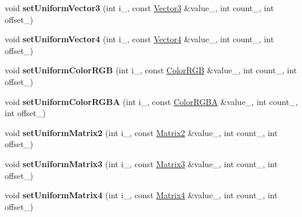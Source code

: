 \begin{DoxyCompactItemize}
\item 
void {\bfseries set\+Uniform\+Vector3} (int i\+\_\+, const \hyperlink{class_i_dream_sky_1_1_vector3}{Vector3} \&value\+\_\+, int count\+\_, int offset\+\_)\hypertarget{class_i_dream_sky_1_1_g_x_shader_program_a8d7a0c80c96948d2d877a1eaf51d56a4}{}\label{class_i_dream_sky_1_1_g_x_shader_program_a8d7a0c80c96948d2d877a1eaf51d56a4}

\item 
void {\bfseries set\+Uniform\+Vector4} (int i\+\_\+, const \hyperlink{class_i_dream_sky_1_1_vector4}{Vector4} \&value\+\_\+, int count\+\_, int offset\+\_)\hypertarget{class_i_dream_sky_1_1_g_x_shader_program_ac1b0f993cfcfcf7ea7949091efaa75c9}{}\label{class_i_dream_sky_1_1_g_x_shader_program_ac1b0f993cfcfcf7ea7949091efaa75c9}

\item 
void {\bfseries set\+Uniform\+Color\+R\+GB} (int i\+\_\+, const \hyperlink{class_i_dream_sky_1_1_color_r_g_b}{Color\+R\+GB} \&value\+\_\+, int count\+\_, int offset\+\_)\hypertarget{class_i_dream_sky_1_1_g_x_shader_program_a62e191fdfec7ebe9ce85afc0a2e31233}{}\label{class_i_dream_sky_1_1_g_x_shader_program_a62e191fdfec7ebe9ce85afc0a2e31233}

\item 
void {\bfseries set\+Uniform\+Color\+R\+G\+BA} (int i\+\_\+, const \hyperlink{class_i_dream_sky_1_1_color_r_g_b_a}{Color\+R\+G\+BA} \&value\+\_\+, int count\+\_, int offset\+\_)\hypertarget{class_i_dream_sky_1_1_g_x_shader_program_a33396be236a683a2db1e4cf3900f7ba8}{}\label{class_i_dream_sky_1_1_g_x_shader_program_a33396be236a683a2db1e4cf3900f7ba8}

\item 
void {\bfseries set\+Uniform\+Matrix2} (int i\+\_\+, const \hyperlink{class_i_dream_sky_1_1_matrix2}{Matrix2} \&value\+\_\+, int count\+\_, int offset\+\_)\hypertarget{class_i_dream_sky_1_1_g_x_shader_program_a8359476a34df1f9e3c9f4ad5d567452f}{}\label{class_i_dream_sky_1_1_g_x_shader_program_a8359476a34df1f9e3c9f4ad5d567452f}

\item 
void {\bfseries set\+Uniform\+Matrix3} (int i\+\_\+, const \hyperlink{class_i_dream_sky_1_1_matrix3}{Matrix3} \&value\+\_\+, int count\+\_, int offset\+\_)\hypertarget{class_i_dream_sky_1_1_g_x_shader_program_aec9fc722c22d8cc4878555988a46f1f6}{}\label{class_i_dream_sky_1_1_g_x_shader_program_aec9fc722c22d8cc4878555988a46f1f6}

\item 
void {\bfseries set\+Uniform\+Matrix4} (int i\+\_\+, const \hyperlink{class_i_dream_sky_1_1_matrix4}{Matrix4} \&value\+\_\+, int count\+\_, int offset\+\_)\hypertarget{class_i_dream_sky_1_1_g_x_shader_program_a25c592b822eb35050ef6680840107ca4}{}\label{class_i_dream_sky_1_1_g_x_shader_program_a25c592b822eb35050ef6680840107ca4}


\end{DoxyCompactItemize}
